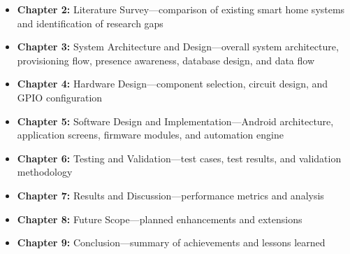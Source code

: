 \begin{itemize}
    \item \textbf{Chapter 2:} Literature Survey—comparison of existing smart home systems and identification of research gaps
    
    \item \textbf{Chapter 3:} System Architecture and Design—overall system architecture, provisioning flow, presence awareness, database design, and data flow
    
    \item \textbf{Chapter 4:} Hardware Design—component selection, circuit design, and GPIO configuration
    
    \item \textbf{Chapter 5:} Software Design and Implementation—Android architecture, application screens, firmware modules, and automation engine
    
    \item \textbf{Chapter 6:} Testing and Validation—test cases, test results, and validation methodology
    
    \item \textbf{Chapter 7:} Results and Discussion—performance metrics and analysis
    
    \item \textbf{Chapter 8:} Future Scope—planned enhancements and extensions
    
    \item \textbf{Chapter 9:} Conclusion—summary of achievements and lessons learned
\end{itemize}
